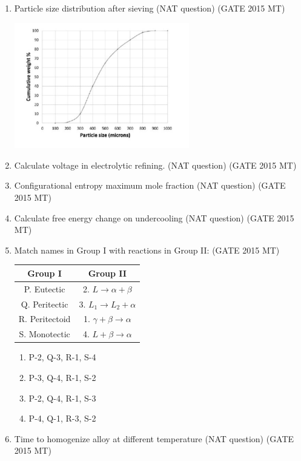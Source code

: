 \documentclass[12pt]{article}
\begin{document}
\begin{enumerate}
\item Particle size distribution after sieving (NAT question) (GATE 2015 MT)
\begin{center}
  \includegraphics[width=0.6\textwidth]{images/q46i.jpg}
\end{center}

\item Calculate voltage in electrolytic refining. (NAT question) (GATE 2015 MT)

\item Configurational entropy maximum mole fraction (NAT question) (GATE 2015 MT)

\item Calculate free energy change on undercooling (NAT question) (GATE 2015 MT)

\item Match names in Group I with reactions in Group II: (GATE 2015 MT)
\begin{table}[h]
\centering
\begin{tabular}{|c|c|}
\hline
Group I & Group II \\
\hline
P. Eutectic & 2. $L \to \alpha + \beta$ \\
Q. Peritectic & 3. $L_1 \to L_2 + \alpha$ \\
R. Peritectoid & 1. $\gamma + \beta \to \alpha$ \\
S. Monotectic & 4. $L + \beta \to \alpha$ \\
\hline
\end{tabular}
\end{table}
\begin{enumerate}[label=(\alph*)]
  \item P-2, Q-3, R-1, S-4
  \item P-3, Q-4, R-1, S-2
  \item P-2, Q-4, R-1, S-3
  \item P-4, Q-1, R-3, S-2
\end{enumerate}

\item Time to homogenize alloy at different temperature (NAT question) (GATE 2015 MT)


\end{enumerate}
\end{document}
